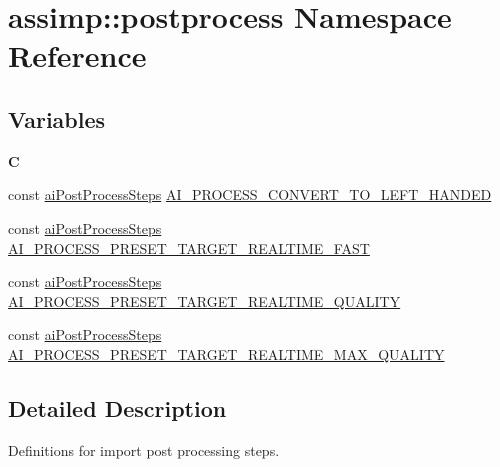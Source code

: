 \hypertarget{namespaceassimp_1_1postprocess}{\section{assimp\+:\+:postprocess Namespace Reference}
\label{namespaceassimp_1_1postprocess}
}
\subsection*{Variables}
\begin{DoxyCompactItemize}
\item 
\hypertarget{namespaceassimp_1_1postprocess_a992e61a8c492f3854b694bdadced2863}{{\bfseries C}}\label{namespaceassimp_1_1postprocess_a992e61a8c492f3854b694bdadced2863}

\item 
const \hyperlink{postprocess_8h_a64795260b95f5a4b3f3dc1be4f52e410}{ai\+Post\+Process\+Steps} \hyperlink{namespaceassimp_1_1postprocess_acc154572eeb907621edff6a9ae360734}{A\+I\+\_\+\+P\+R\+O\+C\+E\+S\+S\+\_\+\+C\+O\+N\+V\+E\+R\+T\+\_\+\+T\+O\+\_\+\+L\+E\+F\+T\+\_\+\+H\+A\+N\+D\+E\+D}
\item 
const \hyperlink{postprocess_8h_a64795260b95f5a4b3f3dc1be4f52e410}{ai\+Post\+Process\+Steps} \hyperlink{namespaceassimp_1_1postprocess_a85780f5bf67521690acbc366347cb991}{A\+I\+\_\+\+P\+R\+O\+C\+E\+S\+S\+\_\+\+P\+R\+E\+S\+E\+T\+\_\+\+T\+A\+R\+G\+E\+T\+\_\+\+R\+E\+A\+L\+T\+I\+M\+E\+\_\+\+F\+A\+S\+T}
\item 
const \hyperlink{postprocess_8h_a64795260b95f5a4b3f3dc1be4f52e410}{ai\+Post\+Process\+Steps} \hyperlink{namespaceassimp_1_1postprocess_acc49259290e35890a2f5c58ffdc0b8fd}{A\+I\+\_\+\+P\+R\+O\+C\+E\+S\+S\+\_\+\+P\+R\+E\+S\+E\+T\+\_\+\+T\+A\+R\+G\+E\+T\+\_\+\+R\+E\+A\+L\+T\+I\+M\+E\+\_\+\+Q\+U\+A\+L\+I\+T\+Y}
\item 
const \hyperlink{postprocess_8h_a64795260b95f5a4b3f3dc1be4f52e410}{ai\+Post\+Process\+Steps} \hyperlink{namespaceassimp_1_1postprocess_a6496316f894a3e7fd973dba09dffb2ad}{A\+I\+\_\+\+P\+R\+O\+C\+E\+S\+S\+\_\+\+P\+R\+E\+S\+E\+T\+\_\+\+T\+A\+R\+G\+E\+T\+\_\+\+R\+E\+A\+L\+T\+I\+M\+E\+\_\+\+M\+A\+X\+\_\+\+Q\+U\+A\+L\+I\+T\+Y}
\end{DoxyCompactItemize}


\subsection{Detailed Description}
Definitions for import post processing steps. 

